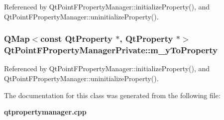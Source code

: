 Referenced by Qt\+Point\+F\+Property\+Manager\+::initialize\+Property(), and Qt\+Point\+F\+Property\+Manager\+::uninitialize\+Property().

\subsubsection[{m\+\_\+y\+To\+Property}]{\setlength{\rightskip}{0pt plus 5cm}Q\+Map$<$const {\bf Qt\+Property} $\ast$, {\bf Qt\+Property} $\ast$$>$ Qt\+Point\+F\+Property\+Manager\+Private\+::m\+\_\+y\+To\+Property}\label{classQtPointFPropertyManagerPrivate_a16a0b555ea64a2108c772522bd21db06}


Referenced by Qt\+Point\+F\+Property\+Manager\+::initialize\+Property(), and Qt\+Point\+F\+Property\+Manager\+::uninitialize\+Property().



The documentation for this class was generated from the following file\+:\begin{DoxyCompactItemize}
\item 
{\bf qtpropertymanager.\+cpp}\end{DoxyCompactItemize}
